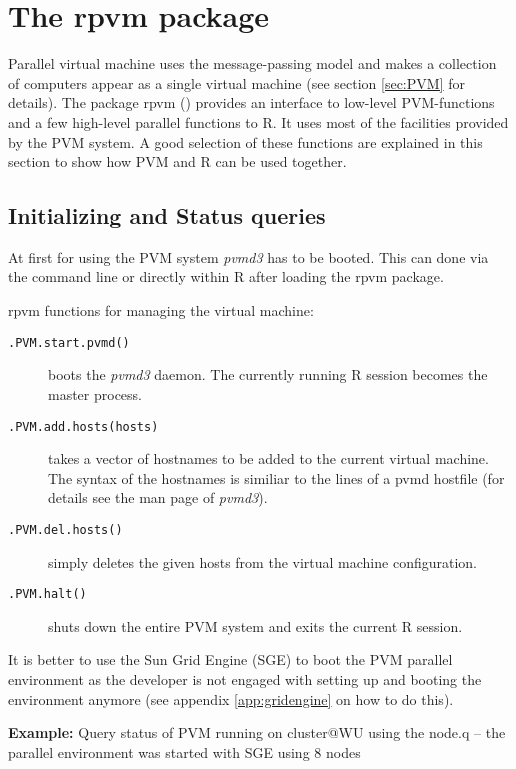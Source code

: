 \section{The rpvm package}
\label{sec:rpvm}
Parallel virtual machine uses the message-passing model and makes a
collection of computers appear as a single virtual machine (see section
\ref{sec:PVM} for details).
The package rpvm (\cite{nali07rpvm}) provides an interface to
low-level PVM-functions and
a few high-level parallel functions to R. It uses most of the
facilities provided by the PVM system. A good selection of these
functions are explained in this section to show how PVM and R can be
used together.

\subsection{Initializing and Status queries}

At first for using the PVM system \textit{pvmd3} has to be
booted. This can done via the command
line or directly within R after loading the rpvm package.


rpvm functions for managing the virtual machine:

\begin{description}
\item[\texttt{.PVM.start.pvmd()}] boots the \textit{pvmd3} daemon. The
  currently running R session becomes the master process. 
\item[\texttt{.PVM.add.hosts(hosts)}] takes a vector of hostnames to
  be added to the current virtual machine. The syntax of the
  hostnames is similiar to the lines of a pvmd hostfile (for details
  see the man page of \textit{pvmd3}). 
\item[\texttt{.PVM.del.hosts()}] simply deletes the given hosts from
  the virtual machine configuration.
\item[\texttt{.PVM.halt()}] shuts down the entire PVM system and exits
  the current R session.
\end{description}
  
It is better to use the Sun Grid Engine (SGE) to boot the PVM parallel
environment as the developer is not engaged with
setting up and booting the environment anymore (see
appendix \ref{app:gridengine} on how to do this).


\textbf{Example:} Query status of PVM \newline
running on cluster@WU using the node.q -- the parallel environment was
started with SGE using 8 nodes

